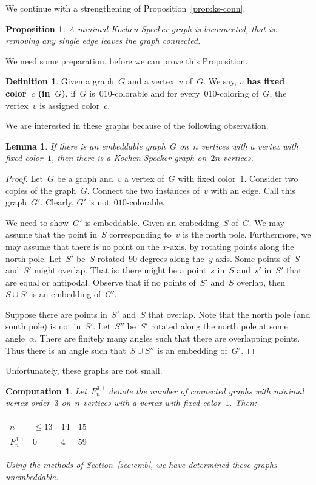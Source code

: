 \documentclass[adraft,copyright,creativecommons]{eptcs}
\newcommand{\keyword}[1]{\textbf{#1}}
\newcounter{main}
\newtheorem{prop}[main]{Proposition}
\newtheorem{comp}[main]{Computation}
\newtheorem{lem}[main]{Lemma}
\theoremstyle{definition}
\newtheorem{dfn}[main]{Definition}
\theoremstyle{remark}
\begin{document}
We continue with a strengthening of Proposition~\ref{prop:ks-conn}.
\begin{prop}\label{prop:ks-biconn}
A minimal Kochen-Specker graph is biconnected,
that is: removing any single edge leaves the graph connected.
\end{prop}
We need some preparation, before we can prove this Proposition.
\begin{dfn}
Given a graph~$G$ and a vertex~$v$ of~$G$.
We say, \keyword{$v$ has fixed color~$c$ (in~$G$)},
if~$G$ is~$010$-colorable
and for every~$010$-coloring of~$G$,
the vertex~$v$ is assigned color~$c$.
\end{dfn}
We are interested in these graphs because of the following observation.
\begin{lem}\label{lem:biconn}
If there is an embeddable graph~$G$ on~$n$ vertices with a vertex
with fixed color~$1$,
then there is a Kochen-Specker graph on~$2n$ vertices.
\end{lem}
\begin{proof}
Let~$G$ be a graph and~$v$ a vertex of~$G$ with fixed color~$1$.
Consider two copies of the graph~$G$.
Connect the two instances of~$v$ with an edge.
Call this graph~$G'$.
Clearly, $G'$ is not~$010$-colorable.

We need to show~$G'$ is embeddable.
Given an embedding~$S$ of~$G$.
We may assume that the point in~$S$ corresponding to~$v$
is the north pole.
Furthermore, we may assume that there is no point on the $x$-axis,
by rotating points along the north pole.
Let~$S'$ be~$S$ rotated~$90$ degrees along the~$y$-axis.
Some points of~$S$ and~$S'$ might overlap.
That is: there might be a point~$s$ in~$S$ and~$s'$ in~$S'$
that are equal or antipodal.
Observe that if no points of~$S'$ and~$S$ overlap,
then~$S \cup S'$ is an embedding of~$G'$.

Suppose there are points in~$S'$ and~$S$
that overlap.
Note that the north pole (and south pole) is not in~$S'$. 
Let~$S''$ be~$S'$ rotated along the north pole at some angle~$\alpha$.
There are finitely many angles such that there are overlapping points.
Thus there is an angle such that~$S \cup S''$ is an embedding of~$G'$.
\end{proof}
Unfortunately, these graphs are not small.
\begin{comp}\label{comp:bic1}
Let~$F^{3,1}_n$ denote the number of connected graphs
with minimal vertex-order~$3$
on~$n$ vertices
with a vertex with fixed color~$1$.
Then:
\begin{center}
\begin{tabular}{l|lll}
    $n$ & $\leq 13$
        & $14$
        & $15$ \\
    \hline
    $F^{3,1}_n$ & $0$
        & $4$
        & $59$
\end{tabular}
\end{center}
Using the methods of Section~\ref{sec:emb},
we have determined these graphs unembeddable.
\end{comp}
\end{document}
